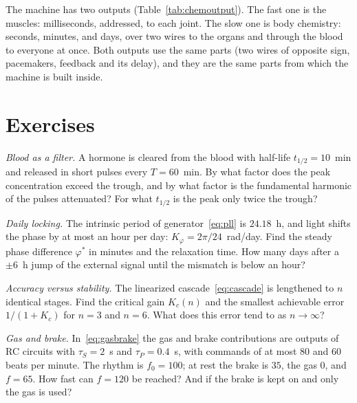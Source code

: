 The machine has two outputs (Table~\ref{tab:chemoutput}). The fast one is the muscles: milliseconds, addressed, to each joint. The slow one is body chemistry: seconds, minutes, and days, over two wires to the organs and through the blood to everyone at once. Both outputs use the same parts (two wires of opposite sign, pacemakers, feedback and its delay), and they are the same parts from which the machine is built inside.

\section{Exercises}

\begin{exercise}[\lvlA]
\label{ex:16:1}
\emph{Blood as a filter.} A hormone is cleared from the blood with half-life $t_{1/2}=10$~min and released in short pulses every $T=60$~min. By what factor does the peak concentration exceed the trough, and by what factor is the fundamental harmonic of the pulses attenuated? For what $t_{1/2}$ is the peak only twice the trough?
\end{exercise}

\begin{exercise}[\lvlA]
\label{ex:16:2}
\emph{Daily locking.} The intrinsic period of generator~\eqref{eq:pll} is $24.18$~h, and light shifts the phase by at most an hour per day: $K_\varphi=2\pi/24$~rad/day. Find the steady phase difference $\varphi^*$ in minutes and the relaxation time. How many days after a $\pm6$~h jump of the external signal until the mismatch is below an hour?
\end{exercise}

\begin{exercise}[\lvlB]
\label{ex:16:3}
\emph{Accuracy versus stability.} The linearized cascade~\eqref{eq:cascade} is lengthened to $n$ identical stages. Find the critical gain $K_c(n)$ and the smallest achievable error $1/(1+K_c)$ for $n=3$ and $n=6$. What does this error tend to as $n\to\infty$?
\end{exercise}

\begin{exercise}[\lvlB]
\label{ex:16:4}
\emph{Gas and brake.} In~\eqref{eq:gasbrake} the gas and brake contributions are outputs of RC circuits with $\tau_S=2$~s and $\tau_P=0.4$~s, with commands of at most $80$ and $60$ beats per minute. The rhythm is $f_0=100$; at rest the brake is $35$, the gas $0$, and $f=65$. How fast can $f=120$ be reached? And if the brake is kept on and only the gas is used?
\end{exercise}

